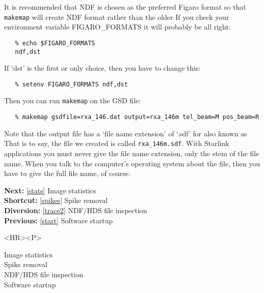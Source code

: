    It is recommended that NDF is chosen as the preferred Figaro format
   so that {\tt makemap} will create NDF format rather than the older
   If you check your
   environment variable FIGARO\_FORMATS it will probably be all right:

\begin{verbatim}
   % echo $FIGARO_FORMATS
   ndf,dst
\end{verbatim}

   If `dst' is the first or only choice, then you have to change this:

\begin{verbatim}
   % setenv FIGARO_FORMATS ndf,dst
\end{verbatim}

   Then you can run {\tt makemap} on the GSD file:

\begin{verbatim}
   % makemap gsdfile=rxa_146.dat output=rxa_146m tel_beam=M pos_beam=R
\end{verbatim}

   Note that the output file has a `file name extension' of `.sdf' for
   also known as
   That is to say, the file we created is called {\tt rxa\_146m.sdf}.
   With Starlink applications you must never give the file name
   extension, only the stem of the file name. When you talk to the
   computer's operating system about the file, then you have to give the
   full file name, of course.

\begin{latexonly}
{\bf Next:} \ref{stats} Image statistics\\
{\bf Shortcut:} \ref{spikes} Spike removal\\
{\bf Diversion:} \ref{trace2} NDF/HDS file inspection\\
{\bf Previous:} \ref{start} Software startup\\
\end{latexonly}

\begin{htmlonly}
\begin{rawhtml} <HR><P> \end{rawhtml}
{\bf {}} Image statistics\\
{\bf {}} Spike removal\\
{\bf {}} NDF/HDS file inspection\\
{\bf {}} Software startup\\
{\bf {}}\\
{\bf {}}\\
\end{htmlonly}


